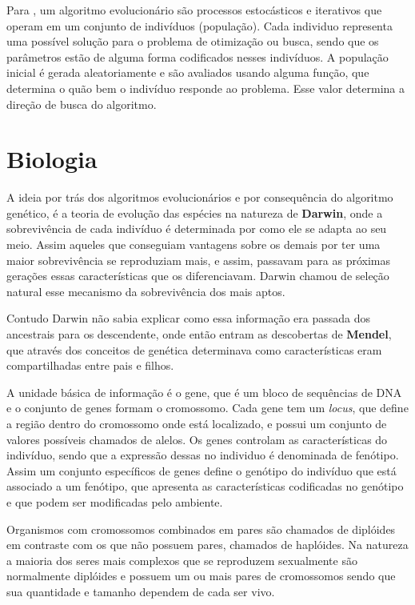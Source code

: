 Para \citeauthor{Sivanandam2007}, um algoritmo evolucionário são processos estocásticos e iterativos que operam em um conjunto de indivíduos (população). Cada individuo representa uma possível solução para o problema de otimização ou busca, sendo que os parâmetros estão de alguma forma codificados nesses indivíduos. A população inicial é gerada aleatoriamente e são avaliados usando alguma função, que determina o quão bem o indivíduo responde ao problema. Esse valor determina a direção de busca do algoritmo. 

\section{Biologia}
A ideia por trás dos algoritmos evolucionários e por consequência do algoritmo genético, é a teoria de evolução das espécies na natureza de \textbf{Darwin}, onde a sobrevivência de cada indivíduo é determinada por como ele se adapta ao seu meio. Assim aqueles que conseguiam vantagens sobre os demais por ter uma maior sobrevivência se reproduziam mais, e assim, passavam para as próximas gerações essas características que os diferenciavam. Darwin chamou de seleção natural esse mecanismo da sobrevivência dos mais aptos.

Contudo Darwin não sabia explicar como essa informação era passada dos ancestrais para os descendente, onde então entram as descobertas de \textbf{Mendel}, que através dos conceitos de genética determinava como características eram compartilhadas entre pais e filhos. 

A unidade básica de informação é o gene, que é um bloco de sequências de DNA e o conjunto de genes formam o cromossomo. Cada gene tem um \textit{locus}, que define a região dentro do cromossomo onde está localizado, e possui um conjunto de valores possíveis chamados de alelos. Os genes controlam as características do indivíduo, sendo que a expressão dessas no individuo é denominada de fenótipo. Assim um conjunto específicos de genes define o genótipo do indivíduo que está associado a um fenótipo, que apresenta as características codificadas no genótipo e que podem ser modificadas pelo ambiente. 

Organismos com cromossomos combinados em pares são chamados de diplóides em contraste com os que não possuem pares, chamados de haplóides. Na natureza a maioria dos seres mais complexos que se reproduzem sexualmente são normalmente diplóides e possuem um ou mais pares de cromossomos sendo que sua quantidade e tamanho dependem de cada ser vivo.

